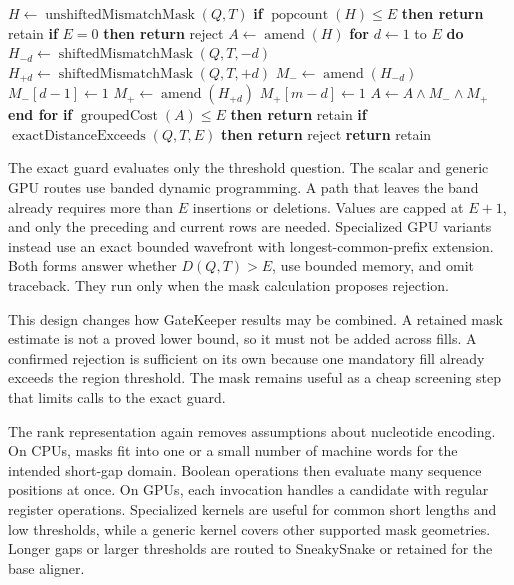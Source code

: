 \begin{algorithm}[H]
\caption{Guarded GateKeeper decision for one equal-length gap}
\label{alg:prefilter-gatekeeper}
\small
\begin{algorithmic}[1]
\State \(H\gets\operatorname{unshiftedMismatchMask}(Q,T)\)
\State \textbf{if} \(\operatorname{popcount}(H)\leq E\)
    \textbf{then return} retain
\State \textbf{if} \(E=0\) \textbf{then return} reject
\State \(A\gets\operatorname{amend}(H)\)
\State \textbf{for} \(d\gets1\) to \(E\) \textbf{do}
    \State \(H_{-d}\gets\operatorname{shiftedMismatchMask}(Q,T,-d)\)
    \State \(H_{+d}\gets\operatorname{shiftedMismatchMask}(Q,T,+d)\)
    \State \(M_-\gets\operatorname{amend}(H_{-d})\)
    \State \(M_-[d-1]\gets1\)
    \State \(M_+\gets\operatorname{amend}(H_{+d})\)
    \State \(M_+[m-d]\gets1\)
    \State \(A\gets A\land M_-\land M_+\)
\State \textbf{end for}
\State \textbf{if} \(\operatorname{groupedCost}(A)\leq E\)
    \textbf{then return} retain
\State \textbf{if} \(\operatorname{exactDistanceExceeds}(Q,T,E)\)
    \textbf{then return} reject
\State \textbf{return} retain
\end{algorithmic}
\end{algorithm}

The exact guard evaluates only the threshold question. The scalar and generic
GPU routes use banded dynamic programming. A path that leaves the band already
requires more than \(E\) insertions or deletions. Values are capped at \(E+1\),
and only the preceding and current rows are needed. Specialized GPU variants
instead use an exact bounded wavefront with longest-common-prefix extension.
Both forms answer whether \(D(Q,T)>E\), use bounded memory, and omit traceback.
They run only when the mask calculation proposes rejection.

This design changes how GateKeeper results may be combined. A retained mask
estimate is not a proved lower bound, so it must not be added across fills. A
confirmed rejection is sufficient on its own because one mandatory fill already
exceeds the region threshold. The mask remains useful as a cheap screening
step that limits calls to the exact guard.

The rank representation again removes assumptions about nucleotide encoding.
On CPUs, masks fit into one or a small number of machine words for the intended
short-gap domain. Boolean operations then evaluate many sequence positions at
once. On GPUs, each invocation handles a candidate with regular register
operations. Specialized kernels are useful for common short lengths and low
thresholds, while a generic kernel covers other supported mask geometries.
Longer gaps or larger thresholds are routed to SneakySnake or retained for the
base aligner.

